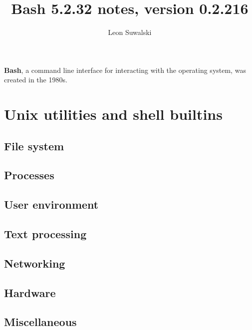 \documentclass{charun}
\title{Bash 5.2.32 notes, version 0.2.216}
\author{Leon Suwalski}
\begin{document}
\begin{multicols*}{3}
\maketitle
\raggedright

\textbf{Bash}, a command line interface for interacting with the operating system, was created in the 1980s.










\newpage
\section{Unix utilities and shell builtins}
\subsection{File system}


\subsection{Processes}


\subsection{User environment}


\subsection{Text processing}


\subsection{Networking}


\subsection{Hardware}


\subsection{Miscellaneous}


\end{multicols*}
\end{document}
